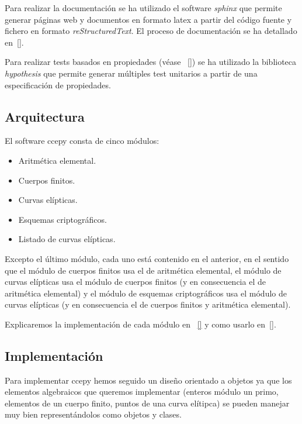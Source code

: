 Para realizar la documentación se ha utilizado el software \emph{sphinx} que permite generar páginas web y documentos en formato latex a partir del código fuente y fichero en formato \emph{reStructuredText}. El proceso de documentación se ha detallado en~\ref{}.

Para realizar tests basados en propiedades (véase ~\ref{}) se ha utilizado la biblioteca \emph{hypothesis} que permite generar múltiples test unitarios a partir de una especificación de propiedades.

\subsection{Arquitectura}
\label{sub:Arquitectura}

El software ccepy consta de cinco módulos:

\begin{itemize}
    \item Aritmética elemental.
    \item Cuerpos finitos.
    \item Curvas elípticas.
    \item Esquemas criptográficos.
    \item Listado de curvas elípticas.
\end{itemize}

Excepto el último módulo, cada uno está contenido en el anterior, en el sentido que el módulo de cuerpos finitos usa el de aritmética elemental, el módulo de curvas elípticas usa el módulo de cuerpos finitos (y en consecuencia el de aritmética elemental) y el módulo de esquemas criptográficos usa el módulo de curvas elípticas (y en consecuencia el de cuerpos finitos y aritmética elemental).

Explicaremos la implementación de cada módulo en ~\ref{} y como usarlo en~\ref{}.

\subsection{Implementación}
\label{sub:Implementación}

Para implementar ccepy hemos seguido un diseño orientado a objetos ya que los elementos algebraicos que queremos implementar (enteros módulo un primo, elementos de un cuerpo finito, puntos de una curva elítipca) se pueden manejar muy bien representándolos como objetos y clases.

